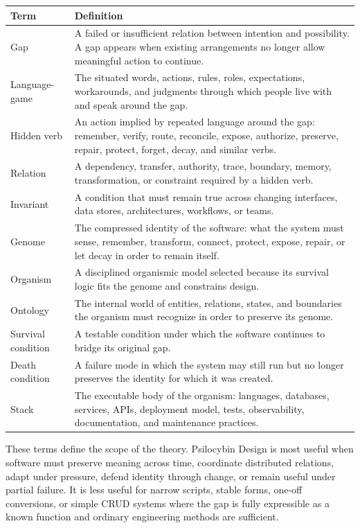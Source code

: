 \documentclass[11pt]{article}
\begin{document}
\begin{longtable}{|p{}|p{}|}
\hline
\textbf{Term} & \textbf{Definition} \\
\hline
Gap & A failed or insufficient relation between intention and possibility. A gap appears when existing arrangements no longer allow meaningful action to continue. \\
\hline
Language-game & The situated words, actions, rules, roles, expectations, workarounds, and judgments through which people live with and speak around the gap. \\
\hline
Hidden verb & An action implied by repeated language around the gap: remember, verify, route, reconcile, expose, authorize, preserve, repair, protect, forget, decay, and similar verbs. \\
\hline
Relation & A dependency, transfer, authority, trace, boundary, memory, transformation, or constraint required by a hidden verb. \\
\hline
Invariant & A condition that must remain true across changing interfaces, data stores, architectures, workflows, or teams. \\
\hline
Genome & The compressed identity of the software: what the system must sense, remember, transform, connect, protect, expose, repair, or let decay in order to remain itself. \\
\hline
Organism & A disciplined organismic model selected because its survival logic fits the genome and constrains design. \\
\hline
Ontology & The internal world of entities, relations, states, and boundaries the organism must recognize in order to preserve its genome. \\
\hline
Survival condition & A testable condition under which the software continues to bridge its original gap. \\
\hline
Death condition & A failure mode in which the system may still run but no longer preserves the identity for which it was created. \\
\hline
Stack & The executable body of the organism: languages, databases, services, APIs, deployment model, tests, observability, documentation, and maintenance practices. \\
\hline
\end{longtable}

These terms define the scope of the theory. Psilocybin Design is most useful when software must preserve meaning across time, coordinate distributed relations, adapt under pressure, defend identity through change, or remain useful under partial failure. It is less useful for narrow scripts, stable forms, one-off conversions, or simple CRUD systems where the gap is fully expressible as a known function and ordinary engineering methods are sufficient.
\end{document}
